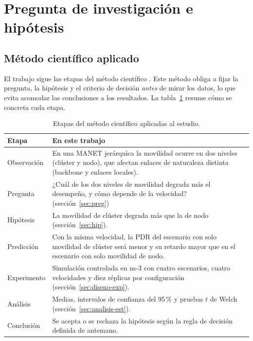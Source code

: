 \section{Pregunta de investigación e hipótesis}
\label{sec:pregunta}

\subsection{Método científico aplicado}

El trabajo sigue las etapas del método científico \cite{bunge1995ciencia}. Este método obliga a fijar la pregunta, la hipótesis y el criterio de
decisión \emph{antes} de mirar los datos, lo que evita acomodar las conclusiones a los
resultados. La tabla~\ref{tab:metodo} resume cómo se concreta cada etapa.

\begin{table}[h]
\centering
\small
\begin{tabular}{p{2.6cm}p{9.4cm}}
\toprule
\textbf{Etapa} & \textbf{En este trabajo} \\
\midrule
Observación & En una MANET jerárquica la movilidad ocurre en dos niveles (clúster y
nodo), que afectan enlaces de naturaleza distinta (backbone y enlaces locales). \\
Pregunta & ¿Cuál de los dos niveles de movilidad degrada más el desempeño, y cómo
depende de la velocidad? (sección~\ref{sec:preg}) \\
Hipótesis & La movilidad de clúster degrada más que la de nodo
(sección~\ref{sec:hip}). \\
Predicción & Con la misma velocidad, la PDR del escenario con solo movilidad de clúster
será menor y su retardo mayor que en el escenario con solo movilidad de nodo. \\
Experimento & Simulación controlada en ns-3 con cuatro escenarios, cuatro velocidades y
diez réplicas por configuración (sección~\ref{sec:diseno-exp}). \\
Análisis & Medias, intervalos de confianza del 95\,\% y pruebas $t$ de Welch
(sección~\ref{sec:analisis-est}). \\
Conclusión & Se acepta o se rechaza la hipótesis según la regla de decisión
definida de antemano. \\
\bottomrule
\end{tabular}
\caption{Etapas del método científico aplicadas al estudio.}
\label{tab:metodo}
\end{table}

